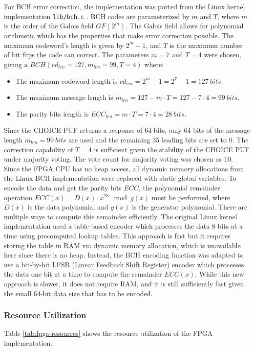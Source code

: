 For BCH error correction, the implementation was ported from the Linux kernel implementation \texttt{lib/bch.c} \cite{linux_bch}. BCH codes are parameterized by  $m$ and $T$, where $m$ is the order of the Galois field $GF(2^m)$. The Galois field allows for polynomial arithmetic which has the properties that make error correction possible. The maximum codeword's length is given by $2^m-1$, and $T$ is the maximum number of bit flips the code can correct. The parameters $m=7$ and $T=4$ were chosen, giving a $BCH(cd_{len}=127, m_{len}=99, T=4)$ where:
\begin{itemize}
    \item The maximum codeword length is $cd_{len}= 2^m-1= 2^7 -1 = 127~bits$.
    \item The maximum message length is $m_{len}=127 - m\cdot T = 127 - 7\cdot4 = 99~bits$.
    \item The parity bits length is $ECC_{len}=m\cdot T = 7\cdot4=28 ~bits$. 
\end{itemize}
Since the CHOICE PUF returns a response of 64 bits, only 64 bits of the message length $m_{len} = 99~bits$ are used and the remaining 35 leading bits are set to 0. The correction capability of $T=4$ is sufficient given the stability of the CHOICE PUF under majority voting. The vote count for majority voting was chosen as 10. Since the FPGA CPU has no heap access, all dynamic memory allocations from the Linux BCH implementation were replaced with static global variables. 
To encode the data and get the parity bits $ECC$, the polynomial remainder operation $ECC(x) = D(x) \cdot x^{28} \mod g(x)$ must be performed, where $D(x)$ is the data polynomial and $g(x)$ is the generator polynomial. There are multiple ways to compute this remainder efficiently. The original Linux kernel implementation used a table-based encoder which processes the data 8 bits at a time using precomputed lookup tables. This approach is fast but it requires storing the table in RAM via dynamic memory allocation, which is unavailable here since there is no heap. Instead, the BCH encoding function was adapted to use a bit-by-bit LFSR (Linear Feedback Shift Register) encoder which processes the data one bit at a time to compute the remainder $ECC(x)$. While this new approach is slower, it does not require RAM, and it is still sufficiently fast given the small 64-bit data size that has to be encoded.

\subsubsection{Resource Utilization}
Table \ref{tab:fpga-resources} shows the resource utilization of the FPGA implementation. 

